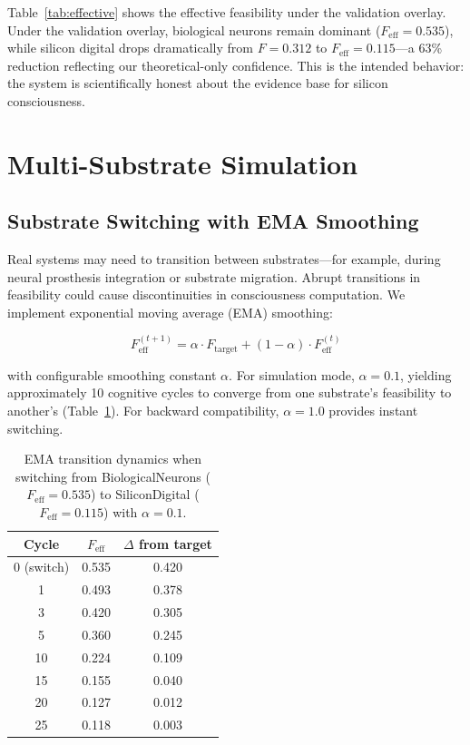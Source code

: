 \documentclass[12pt,a4paper]{article}
\begin{document}
Table~\ref{tab:effective} shows the effective feasibility under the validation overlay. Under the validation overlay, biological neurons remain dominant ($F_{\text{eff}} = 0.535$), while silicon digital drops dramatically from $F = 0.312$ to $F_{\text{eff}} = 0.115$---a 63\% reduction reflecting our theoretical-only confidence. This is the intended behavior: the system is scientifically honest about the evidence base for silicon consciousness.

\section{Multi-Substrate Simulation}

\subsection{Substrate Switching with EMA Smoothing}

Real systems may need to transition between substrates---for example, during neural prosthesis integration or substrate migration. Abrupt transitions in feasibility could cause discontinuities in consciousness computation. We implement exponential moving average (EMA) smoothing:

\begin{equation}
F_{\text{eff}}^{(t+1)} = \alpha \cdot F_{\text{target}} + (1 - \alpha) \cdot F_{\text{eff}}^{(t)}
\label{eq:ema}
\end{equation}

with configurable smoothing constant $\alpha$. For simulation mode, $\alpha = 0.1$, yielding approximately 10 cognitive cycles to converge from one substrate's feasibility to another's (Table~\ref{tab:ema}). For backward compatibility, $\alpha = 1.0$ provides instant switching.

\begin{table}[H]
\centering
\caption{EMA transition dynamics when switching from BiologicalNeurons ($F_{\text{eff}} = 0.535$) to SiliconDigital ($F_{\text{eff}} = 0.115$) with $\alpha = 0.1$.}
\label{tab:ema}
\begin{tabular}{ccc}
\toprule
\textbf{Cycle} & $F_{\text{eff}}$ & \textbf{$\Delta$ from target} \\
\midrule
0 (switch) & 0.535 & 0.420 \\
1 & 0.493 & 0.378 \\
3 & 0.420 & 0.305 \\
5 & 0.360 & 0.245 \\
10 & 0.224 & 0.109 \\
15 & 0.155 & 0.040 \\
20 & 0.127 & 0.012 \\
25 & 0.118 & 0.003 \\
\bottomrule
\end{tabular}
\end{table}
\end{document}
